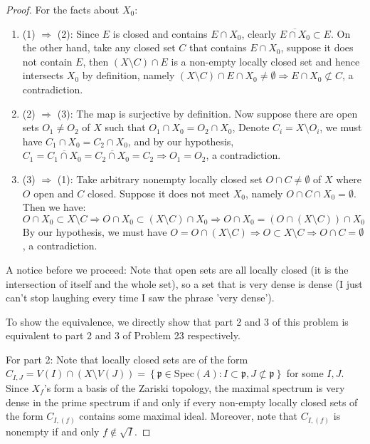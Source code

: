 \documentclass{solution}
\begin{document}
\begin{proof}
    For the facts about $X_0$:
    \begin{enumerate}
        \item (1) $\Rightarrow$ (2): Since $E$ is closed and contains $E \cap X_0$, clearly $\overline{E \cap X_0} \subset E$. On the other hand, take any closed set $C$ that contains $E \cap X_0$, suppose it does not contain $E$, then $(X \setminus C) \cap E$ is a non-empty locally closed set and hence intersects $X_0$ by definition, namely $(X \setminus C) \cap E \cap X_0 \ne \emptyset \Rightarrow E \cap X_0 \not\subset C$, a contradiction.
        \item (2) $\Rightarrow$ (3): The map is surjective by definition. Now suppose there are open sets $O_1 \ne O_2$ of $X$ such that $O_1 \cap X_0 = O_2 \cap X_0$, Denote $C_i = X \setminus O_i$, we must have $C_1 \cap X_0 = C_2 \cap X_0$, and by our hypothesis, $C_1 = \overline{C_1 \cap X_0} = \overline{C_2 \cap X_0} = C_2 \Rightarrow O_1 = O_2$, a contradiction.
        \item (3) $\Rightarrow$ (1): Take arbitrary nonempty locally closed set $O \cap C \ne \emptyset$ of $X$ where $O$ open and $C$ closed. Suppose it does not meet $X_0$, namely $O \cap C \cap X_0 = \emptyset$. Then we have:
        $$O \cap X_0 \subset X \setminus C \Rightarrow O \cap X_0 \subset (X \setminus C) \cap X_0 \Rightarrow O \cap X_0 = (O \cap (X \setminus C)) \cap X_0$$
        By our hypothesis, we must have $O = O \cap (X \setminus C) \Rightarrow O \subset X \setminus C \Rightarrow O \cap C = \emptyset$, a contradiction.
    \end{enumerate}

    A notice before we proceed: Note that open sets are all locally closed (it is the intersection of itself and the whole set), so a set that is very dense is dense (I just can't stop laughing every time I saw the phrase 'very dense').

    To show the equivalence, we directly show that part 2 and 3 of this problem is equivalent to part 2 and 3 of Problem 23 respectively.

    For part 2: Note that locally closed sets are of the form $C_{I, J} = V(I) \cap (X \setminus V(J)) = \left\lbrace \mathfrak{p} \in \mathrm{Spec}(A): I \subset \mathfrak{p}, J \not \subset \mathfrak{p} \right\rbrace$ for some $I, J$. Since $X_f$'s form a basis of the Zariski topology, the maximal spectrum is very dense in the prime spectrum if and only if every non-empty locally closed sets of the form $C_{I, (f)}$ contains some maximal ideal. Moreover, note that $C_{I, (f)}$ is nonempty if and only $f \notin \sqrt{I}$.


\end{proof}
\end{document}
